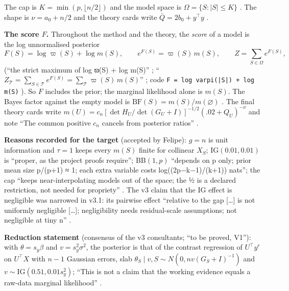 The cap is $K=\min(p,\lfloor n/2\rfloor)$ and the model space is $\Omega=\{S:|S|\le K\}$
 . The shape is
$\nu=a_0+n/2$ and the theory cards write $\bar Q=2b_0+y^\top y$ .

\textbf{The score $F$.} Throughout the method and the theory, the \emph{score} of a model is the log unnormalised posterior
\[
F(S)=\log\varpi(S)+\log m(S),\qquad e^{F(S)}=\varpi(S)\,m(S),\qquad Z=\textstyle\sum_{S\in\Omega}e^{F(S)},
\]
(``the strict maximum of log ϖ(S) + log m(S)'' ; ``$Z_{\mathcal T}=\sum_{S\in\mathcal T}e^{F(S)}=\sum_{\mathcal T}\varpi(S)\,m(S)$'' ; code
\texttt{F = log varpi(|S|) + log m(S)} ).
So $F$ includes the prior; the marginal likelihood alone is $m(S)$. The Bayes factor against the empty model is
$\mathrm{BF}(S)=m(S)/m(\varnothing)$ . The final theory cards write
$m(U)=c_n[\det H_U/\det(G_U+I)]^{-1/2}(.02+Q_U)^{-\nu}$ and note ``The common positive $c_n$ cancels from posterior
ratios'' .

\textbf{Reasons recorded for the target} (accepted by Felipe): $g=n$ is unit information and $\tau=1$ keeps every $m(S)$
finite for collinear $X_S$; IG$(0.01,0.01)$ is ``proper, as the project proofs require''; BB$(1,p)$ ``depends on p only;
prior mean size p/(p+1) ≈ 1; each extra variable costs log((2p−k−1)/(k+1)) nats''; the cap ``keeps near-interpolating
models out of the space; the ½ is a declared restriction, not needed for propriety''
. The v3 claim that the IG effect is negligible was narrowed in v3.1: its
pairwise effect ``relative to the gap [\dots] is not uniformly negligible [\dots]; negligibility needs residual-scale
assumptions; not negligible at tiny n'' .

\textbf{Reduction statement} (consensus of the v3 consultants; ``to be proved, V1''): with $\theta=s_y\beta$ and
$v=s_y^2\sigma^2$, the posterior is that of the contrast regression of $U^\top y^r$ on $U^\top X$ with $n-1$ Gaussian errors,
slab $\theta_S\mid v,S\sim N(0,nv(G_S+I)^{-1})$ and $v\sim\mathrm{IG}(0.51,0.01s_y^2)$; ``This is not a claim that the
working evidence equals a raw-data marginal likelihood'' .

